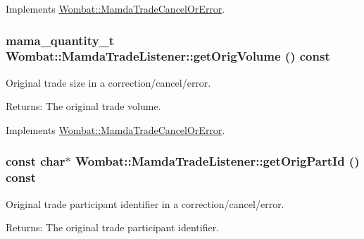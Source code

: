 Implements \hyperlink{classWombat_1_1MamdaTradeCancelOrError_f30fe9dc7c0325555e8fa31f0865d4b4}{Wombat::Mamda\-Trade\-Cancel\-Or\-Error}.\hypertarget{classWombat_1_1MamdaTradeListener_0e179272d95923e3da5df3bf67bfb643}{
\subsubsection[getOrigVolume]{\setlength{\rightskip}{0pt plus 5cm}mama\_\-quantity\_\-t Wombat::Mamda\-Trade\-Listener::get\-Orig\-Volume () const}}
\label{classWombat_1_1MamdaTradeListener_0e179272d95923e3da5df3bf67bfb643}


Original trade size in a correction/cancel/error. 

\begin{Desc}
\item[Returns:]The original trade volume. \end{Desc}


Implements \hyperlink{classWombat_1_1MamdaTradeCancelOrError_e821262ca4d590263adc9a6bacd014b0}{Wombat::Mamda\-Trade\-Cancel\-Or\-Error}.\hypertarget{classWombat_1_1MamdaTradeListener_473edf5c6bb8db20a5d2d57f503d7601}{
\subsubsection[getOrigPartId]{\setlength{\rightskip}{0pt plus 5cm}const char$\ast$ Wombat::Mamda\-Trade\-Listener::get\-Orig\-Part\-Id () const}}
\label{classWombat_1_1MamdaTradeListener_473edf5c6bb8db20a5d2d57f503d7601}


Original trade participant identifier in a correction/cancel/error. 

\begin{Desc}
\item[Returns:]The original trade participant identifier. \end{Desc}


